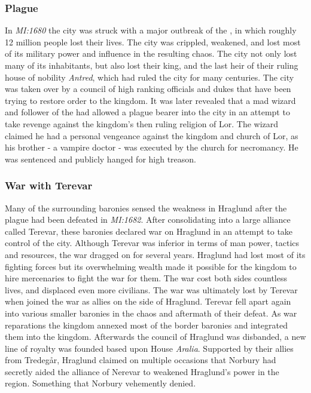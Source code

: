 \subsubsection{Plague}
\label{sec:Plague}

In \emph{MI:1680} the city was struck with a major outbreak of
the , in which roughly 12 million people lost their
lives. The city was crippled, weakened, and lost most of its military power
and influence in the resulting chaos. The city not only lost many of its
inhabitants, but also lost their king, and the last heir of their ruling house
of nobility \emph{Antred}, which had ruled the city for many centuries. The
city was taken over by a council of high ranking officials and dukes that have
been trying to restore order to the kingdom. It was later revealed that a mad
wizard and follower of the  had allowed a plague bearer into
the city in an attempt to take revenge against the kingdom's then ruling
religion of Lor. The wizard claimed he had a personal vengeance against the
kingdom and church of Lor, as his brother - a vampire doctor - was executed by
the church for necromancy. He was sentenced and publicly hanged for high
treason.

\subsubsection{War with Terevar}
\label{sec:Terevar}

Many of the surrounding baronies sensed the weakness in Hraglund after the
plague had been defeated in \emph{MI:1682}. After consolidating into a large
alliance called Terevar, these baronies declared war on Hraglund in an attempt
to take control of the city. Although Terevar was inferior in terms of man
power, tactics and resources, the war dragged on for several years. Hraglund
had lost most of its fighting forces but its overwhelming wealth made it
possible for the kingdom to hire mercenaries to fight the war for them. The
war cost both sides countless lives, and displaced even more civilians. The
war was ultimately lost by Terevar when  joined the war
as allies on the side of Hraglund. Terevar fell apart again into various
smaller baronies in the chaos and aftermath of their defeat. As war
reparations the kingdom annexed most of the border baronies and integrated
them into the kingdom. Afterwards the council of Hraglund was disbanded, a new
line of royalty was founded based upon House \emph{Aralia}. Supported by their
allies from Tredegår, Hraglund claimed on multiple occasions that Norbury had
secretly aided the alliance of Nerevar to weakened Hraglund's power in the
region. Something that Norbury vehemently denied.

